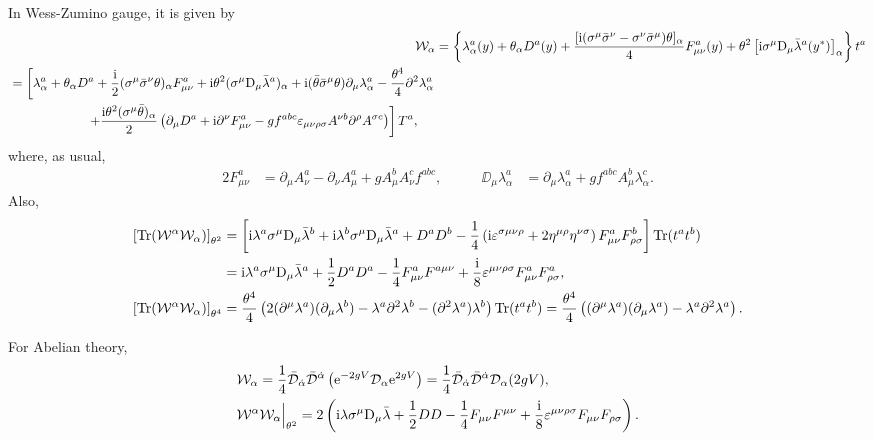 \documentclass[CheatSheet]{subfiles}
\begin{document}
In Wess-Zumino gauge, it is given by
\begin{align}
\mathcal W_\alpha &=\left\{
\lambda_{\alpha}^{a}(y)+\theta_\alpha D^{a}(y)+\frac{[{\mathrm{i}}(\sigma^{\mu}\bar\sigma^{\nu}-\sigma^{\nu}\bar\sigma^{\mu})\theta]_\alpha}{4} F^a_{\mu\nu}(y)
+\theta^2 \left[{\mathrm{i}}\sigma^{\mu}{\mathrm{D}}_\mu\bar{\lambda}^a(y^*)\right]_\alpha
\right\}t^a
\\\begin{split}&=\left[
\lambda_{\alpha}^{a}+\theta_\alpha D^{a}+\frac{{\mathrm{i}}}{2} (\sigma^{\mu}\bar\sigma^{\nu}\theta)_\alpha F^a_{\mu\nu}
+{\mathrm{i}} \theta^2(\sigma^{\mu}{\mathrm{D}}_{\mu}\bar{\lambda}^{a})_\alpha
+{\mathrm{i}}(\bar\theta\bar\sigma^{\mu}\theta)\partial_{\mu}\lambda _{\alpha}^{a}
-\frac{\theta^4}{4} \partial^2\lambda _{\alpha}^{a}
\right.\\&\qquad\qquad\qquad\left.
+\frac{{\mathrm{i}}\theta^2(\sigma^{\mu}\bar\theta)_{\alpha}}{2} \left(\partial_{\mu}D^{a}
+{\mathrm{i}}\partial^\nu F^a_{\mu\nu}
- gf^{abc}\varepsilon_{\mu\nu \rho\sigma}  A^{\nu b}\partial^{\rho}A^{\sigma c}
\right)\right]T^{a},
\end{split}
\end{align}
where, as usual,
\begin{alignat}{2}
F^a_{\mu\nu}&=\partial_{\mu}A_\nu^a-\partial_{\nu}A_\mu^a+g A_\mu^b A_\nu^c f^{abc},
&\qquad
\DD_\mu\lambda^a_\alpha
&=\partial_{\mu}\lambda^{a}_\alpha+g f^{abc}A_\mu^{b}\lambda^{c}_\alpha.
\end{alignat}
Also,
\begin{align}
 \left[\operatorname{\mathrm{Tr}}(\mathcal W^\alpha\mathcal W_\alpha)\right]_{\theta^2}
&=
\left[
{\mathrm{i}}\lambda^a\sigma^{\mu}{\mathrm{D}}_{\mu}\bar{\lambda}^{b}
+{\mathrm{i}}\lambda^b\sigma^{\mu}{\mathrm{D}}_{\mu}\bar{\lambda}^{a}
+D^a D^{b}
-\frac{1}{4}\left({\mathrm{i}} \varepsilon^{\sigma\mu \nu\rho}+2\eta^{\mu\rho}\eta^{\nu\sigma}\right)
F^a_{\mu\nu}F^b_{\rho\sigma}
\right]
\operatorname{\mathrm{Tr}}(t^at^b)
\\
&=
{\mathrm{i}}\lambda^a\sigma^{\mu}{\mathrm{D}}_{\mu}\bar{\lambda}^a
+\frac12D^a D^a
-\frac14F^a_{\mu\nu}F^{a\mu\nu}
+\frac{{\mathrm{i}}}{8}\varepsilon^{\mu \nu\rho\sigma}
F^a_{\mu\nu}F^a_{\rho\sigma},
\\
 \left[\operatorname{\mathrm{Tr}}(\mathcal W^\alpha\mathcal W_\alpha)\right]_{\theta^4}
&=
\frac{\theta^4}{4} \left(2 (\partial^{\mu}\lambda^{a})(\partial_{\mu}\lambda^{b})-\lambda^{a}\partial^2\lambda^{b}-(\partial^2\lambda^{a})\lambda^b\right)\operatorname{\mathrm{Tr}}(t^at^b)
=
\frac{\theta^4}{4} \left((\partial^{\mu}\lambda^{a})(\partial_{\mu}\lambda^{a})-\lambda^{a}\partial^2\lambda^{a}\right).
\end{align}

For Abelian theory,
\begin{align}
& \mathcal W_\alpha = \frac14\bar{\mathcal D}_{\dot\alpha}\bar{\mathcal D}^{\dot\alpha}\left({\mathrm{e}}^{-2gV}{\mathcal D}_\alpha{\mathrm{e}}^{2gV}\right)
=\frac14\bar{\mathcal D}_{\dot\alpha}\bar{\mathcal D}^{\dot\alpha}{\mathcal D}_\alpha(2gV),
\\
& \mathcal W^\alpha\mathcal W_\alpha\Big|_{\theta^2}
=2\left(
{\mathrm{i}}\lambda\sigma^{\mu}{\mathrm{D}}_{\mu}\bar{\lambda}
+\frac12DD
-\frac14F_{\mu\nu}F^{\mu\nu}
+\frac{{\mathrm{i}}}{8}\varepsilon^{\mu \nu\rho\sigma}
F_{\mu\nu}F_{\rho\sigma}\right).
\end{align}
\end{document}
